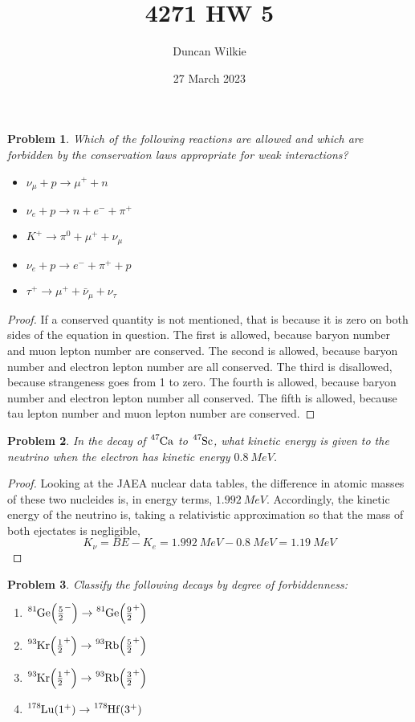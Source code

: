 \documentclass{article}
\title{4271 HW 5}
\author{Duncan Wilkie}
\date{27 March 2023}
\newtheorem{plm}{Problem}
\begin{document}
\maketitle

\begin{plm}
  Which of the following reactions are allowed and which are forbidden by the conservation laws appropriate for weak interactions?
  \begin{itemize}
  \item $\nu_{\mu} + p \to \mu^{+} + n$
  \item $\nu_{e} + p \to n + e^{-} + \pi^{+}$
  \item $K^{+} \to \pi^{0} + \mu^{+} + \nu_{\mu}$
  \item $\nu_{e} + p \to e^{-} + \pi^{+} + p$
  \item $\tau^{+} \to \mu^{+} + \bar{\nu}_{\mu} + \nu_{\tau}$
  \end{itemize}
\end{plm}

\begin{proof}
  If a conserved quantity is not mentioned, that is because it is zero on both sides of the equation in question.
  The first is allowed, because baryon number and muon lepton number are conserved.
  The second is allowed, because baryon number and electron lepton number are all conserved.
  The third is disallowed, because strangeness goes from 1 to zero.
  The fourth is allowed, because baryon number and electron lepton number all conserved.
  The fifth is allowed, because tau lepton number and muon lepton number are conserved.
\end{proof}

\begin{plm}
  In the decay of $\ce{^{47}Ca}$ to $\ce{^{47}Sc}$, what kinetic energy is given to the neutrino when the electron
  has kinetic energy $\SI{0.8}{MeV}$.
\end{plm}

\begin{proof}
  Looking at the JAEA nuclear data tables, the difference in atomic masses of these two nucleides is, in energy terms, $\SI{1.992}{MeV}$.
  Accordingly, the kinetic energy of the neutrino is, taking a relativistic approximation so that the mass of both ejectates is negligible,
  \[
    K_{\nu} = BE - K_{e} = \SI{1.992}{MeV} - \SI{0.8}{MeV} = \SI{1.19}{MeV}
  \]
\end{proof}

\begin{plm}
  Classify the following decays by degree of forbiddenness:
  \begin{enumerate}
  \item $\ce{^{81}Ge}\qty(\frac{5}{2}^{-}) \to \ce{^{81}Ge}\qty(\frac{9}{2}^{+})$
  \item $\ce{^{93}Kr}\qty(\frac{1}{2}^{+}) \to \ce{^{93}Rb}\qty(\frac{5}{2}^{+})$
  \item $\ce{^{93}Kr}\qty(\frac{1}{2}^{+}) \to \ce{^{93}Rb}\qty(\frac{3}{2}^{+})$
  \item $\ce{^{178}Lu}\qty(1^{+}) \to \ce{^{178}Hf}\qty(3^{+})$
  \end{enumerate}
\end{plm}
\end{document}
